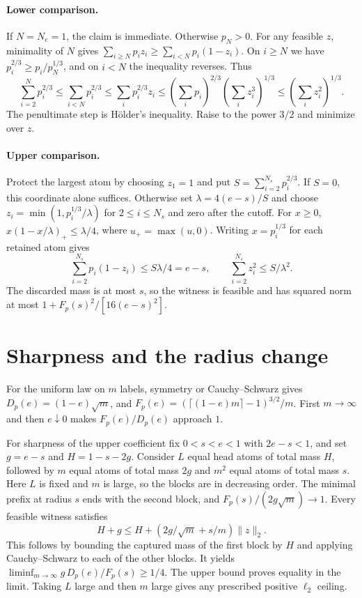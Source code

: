 \documentclass[11pt]{article}
\newcommand{\F}{F_p}
\newcommand{\D}{D_p}
\begin{document}
\paragraph{Lower comparison.}
If \(N=N_e=1\), the claim is immediate. Otherwise \(p_N>0\). For
any feasible \(z\), minimality of \(N\) gives
\(\sum_{i\ge N}p_i z_i\ge\sum_{i<N}p_i(1-z_i)\).
On \(i\ge N\) we have \(p_i^{2/3}\ge p_i/p_N^{1/3}\), and on
\(i<N\) the inequality reverses. Thus
\[
 \sum_{i=2}^N p_i^{2/3}
 \le\sum_{i<N}p_i^{2/3}
 \le\sum_i p_i^{2/3}z_i
 \le
 \left(\sum_i p_i\right)^{2/3}\left(\sum_i z_i^3\right)^{1/3}
 \le\left(\sum_i z_i^2\right)^{1/3}.
\]
The penultimate step is Hölder's inequality. Raise to the power
\(3/2\) and minimize over \(z\).

\paragraph{Upper comparison.}
Protect the largest atom by choosing \(z_1=1\) and put
\(S=\sum_{i=2}^{N_s}p_i^{2/3}\). If \(S=0\), this coordinate alone
suffices. Otherwise set \(\lambda=4(e-s)/S\) and choose
\(z_i=\min(1,p_i^{1/3}/\lambda)\) for \(2\le i\le N_s\) and zero
after the cutoff. For \(x\ge0\),
\(x(1-x/\lambda)_+\le\lambda/4\), where \(u_+=\max(u,0)\).
Writing \(x=p_i^{1/3}\) for each retained atom gives
\[
 \sum_{i=2}^{N_s}p_i(1-z_i)\le S\lambda/4=e-s,\qquad
 \sum_{i=2}^{N_s}z_i^2\le S/\lambda^2.
\]
The discarded mass is at most \(s\), so the witness is feasible
and has squared norm at most \(1+\F(s)^2/[16(e-s)^2]\).

\section{Sharpness and the radius change}
For the uniform law on \(m\) labels, symmetry or Cauchy--Schwarz
gives \(\D(e)=(1-e)\sqrt m\), and
\(\F(e)=(\lceil(1-e)m\rceil-1)^{3/2}/m\).
First \(m\to\infty\) and then \(e\downarrow0\) makes
\(\F(e)/\D(e)\) approach \(1\).

For sharpness of the upper coefficient fix \(0<s<e<1\) with
\(2e-s<1\), and set \(g=e-s\) and \(H=1-s-2g\).
Consider \(L\) equal head atoms of total mass \(H\), followed by
\(m\) equal atoms of total mass \(2g\) and \(m^2\) equal atoms of
total mass \(s\). Here \(L\) is fixed and \(m\) is large, so the
blocks are in decreasing order. The minimal prefix at radius \(s\)
ends with the second block, and \(\F(s)/(2g\sqrt m)\to1\).
Every feasible witness satisfies
\[
 H+g
 \le H+\left(2g/\sqrt m+s/m\right)\|z\|_2 .
\]
This follows by bounding the captured mass of the first block by
\(H\) and applying Cauchy--Schwarz to each of the other blocks.
It yields \(\liminf_{m\to\infty}g\,\D(e)/\F(s)\ge1/4\).
The upper bound proves equality in the limit. Taking \(L\) large
and then \(m\) large gives any prescribed positive \(\ell_2\) ceiling.
\end{document}
